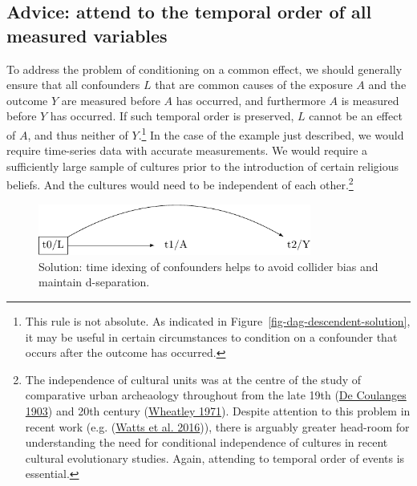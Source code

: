 \documentclass[
  singlecolumn]{report}
\begin{document}
\hypertarget{advice-attend-to-the-temporal-order-of-all-measured-variables-1}{%
\subsection{Advice: attend to the temporal order of all measured
variables}\label{advice-attend-to-the-temporal-order-of-all-measured-variables-1}}

To address the problem of conditioning on a common effect, we should
generally ensure that all confounders \(L\) that are common causes of
the exposure \(A\) and the outcome \(Y\) are measured before \(A\) has
occurred, and furthermore \(A\) is measured before \(Y\) has occurred.
If such temporal order is preserved, \(L\) cannot be an effect of \(A\),
and thus neither of \(Y\).\footnote{This rule is not absolute. As
  indicated in Figure~\ref{fig-dag-descendent-solution}, it may be
  useful in certain circumstances to condition on a confounder that
  occurs after the outcome has occurred.} In the case of the example
just described, we would require time-series data with accurate
measurements. We would require a sufficiently large sample of cultures
prior to the introduction of certain religious beliefs. And the cultures
would need to be independent of each other.\footnote{The independence of
  cultural units was at the centre of the study of comparative urban
  archeaology throughout from the late 19th
  (\protect\hyperlink{ref-decoulanges1903}{De Coulanges 1903}) and 20th
  century (\protect\hyperlink{ref-wheatley1971}{Wheatley 1971}). Despite
  attention to this problem in recent work (e.g.
  (\protect\hyperlink{ref-watts2016}{Watts et al. 2016})), there is
  arguably greater head-room for understanding the need for conditional
  independence of cultures in recent cultural evolutionary studies.
  Again, attending to temporal order of events is essential.}

\begin{figure}

{\centering \includegraphics[width=0.8\textwidth,height=\textheight]{causal-dags_files/figure-pdf/fig-dag-common-effect-solution-1.pdf}

}

\caption{\label{fig-dag-common-effect-solution}Solution: time idexing of
confounders helps to avoid collider bias and maintain d-separation.}

\end{figure}
\end{document}
